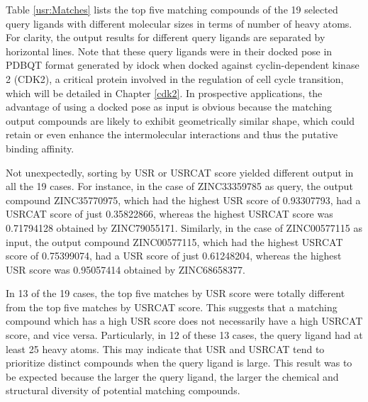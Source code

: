 Table \ref{usr:Matches} lists the top five matching compounds of the 19 selected query ligands with different molecular sizes in terms of number of heavy atoms. For clarity, the output results for different query ligands are separated by horizontal lines. Note that these query ligands were in their docked pose in PDBQT format generated by idock \citep{1362} when docked against cyclin-dependent kinase 2 (CDK2), a critical protein involved in the regulation of cell cycle transition, which will be detailed in Chapter \ref{cdk2}. In prospective applications, the advantage of using a docked pose as input is obvious because the matching output compounds are likely to exhibit geometrically similar shape, which could retain or even enhance the intermolecular interactions and thus the putative binding affinity.

Not unexpectedly, sorting by USR or USRCAT score yielded different output in all the 19 cases. For instance, in the case of ZINC33359785 as query, the output compound ZINC35770975, which had the highest USR score of 0.93307793, had a USRCAT score of just 0.35822866, whereas the highest USRCAT score was 0.71794128 obtained by ZINC79055171. Similarly, in the case of ZINC00577115 as input, the output compound ZINC00577115, which had the highest USRCAT score of 0.75399074, had a USR score of just 0.61248204, whereas the highest USR score was 0.95057414 obtained by ZINC68658377.

In 13 of the 19 cases, the top five matches by USR score were totally different from the top five matches by USRCAT score. This suggests that a matching compound which has a high USR score does not necessarily have a high USRCAT score, and vice versa. Particularly, in 12 of these 13 cases, the query ligand had at least 25 heavy atoms. This may indicate that USR and USRCAT tend to prioritize distinct compounds when the query ligand is large. This result was to be expected because the larger the query ligand, the larger the chemical and structural diversity of potential matching compounds.

